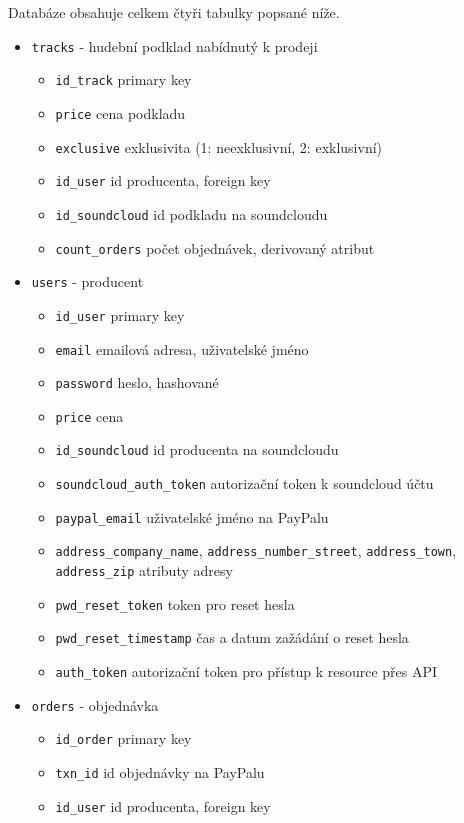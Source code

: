 \documentclass[12pt]{article}
\begin{document}
Databáze obsahuje celkem čtyři tabulky popsané níže.

\begin{itemize}
\item{\texttt{tracks}} - hudební podklad nabídnutý k prodeji
  \begin{itemize}
  \item{\texttt{id\_track}} primary key
  \item{\texttt{price}} cena podkladu
  \item{\texttt{exclusive}} exklusivita (1: neexklusivní, 2: exklusivní)
  \item{\texttt{id\_user}} id producenta, foreign key
  \item{\texttt{id\_soundcloud}} id podkladu na soundcloudu
  \item{\texttt{count\_orders}} počet objednávek, derivovaný atribut
  \end{itemize}
\item{\texttt{users}} - producent
  \begin{itemize}
  \item{\texttt{id\_user}} primary key
  \item{\texttt{email}} emailová adresa, uživatelské jméno
  \item{\texttt{password}} heslo, hashované
  \item{\texttt{price}} cena
  \item{\texttt{id\_soundcloud}} id producenta na soundcloudu
  \item{\texttt{soundcloud\_auth\_token}} autorizační token k soundcloud účtu
  \item{\texttt{paypal\_email}} uživatelské jméno na PayPalu
  \item{\texttt{address\_company\_name}, \texttt{address\_number\_street}, \texttt{address\_town}, \texttt{address\_zip}} atributy adresy
  \item{\texttt{pwd\_reset\_token}} token pro reset hesla
  \item{\texttt{pwd\_reset\_timestamp}} čas a datum zažádání o reset hesla 
  \item{\texttt{auth\_token}} autorizační token pro přístup k resource přes API
  \end{itemize}
\item{\texttt{orders}} - objednávka
  \begin{itemize}
  \item{\texttt{id\_order}} primary key
  \item{\texttt{txn\_id}} id objednávky na PayPalu
  \item{\texttt{id\_user}} id producenta, foreign key

\end{itemize}
\end{itemize}
\end{document}
